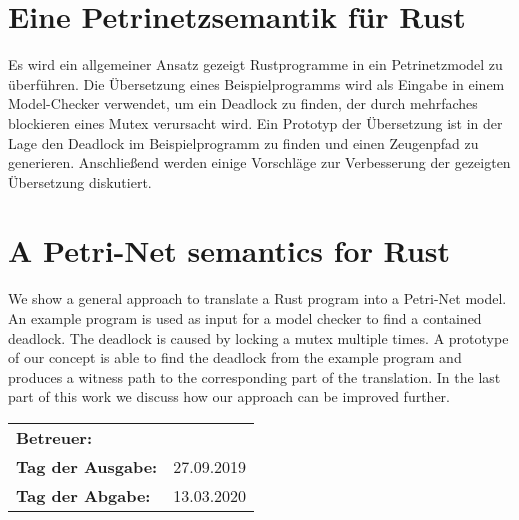 \section*{Eine Petrinetzsemantik für Rust}
Es wird ein allgemeiner Ansatz gezeigt Rustprogramme in ein Petrinetzmodel zu überführen.
Die Übersetzung eines Beispielprogramms wird als Eingabe in einem Model-Checker verwendet, um ein Deadlock zu finden, der durch mehrfaches blockieren eines Mutex verursacht wird.
Ein Prototyp der Übersetzung ist in der Lage den Deadlock im Beispielprogramm zu finden und einen Zeugenpfad zu generieren.
Anschließend werden einige Vorschläge zur Verbesserung der gezeigten Übersetzung diskutiert.

\section*{A Petri-Net semantics for Rust}
We show a general approach to translate a Rust program into a Petri-Net model.
An example program is used as input for a model checker to find a contained deadlock.
The deadlock is caused by locking a mutex multiple times.
A prototype of our concept is able to find the deadlock from the example program and produces a witness path to the corresponding part of the translation.
In the last part of this work we discuss how our approach can be improved further.

\vfill

\begin{tabular}{ll}
	\bfseries Betreuer: & \parbox[t]{10cm}{\betreuer }\vspace{5mm} \\
	\bfseries Tag der Ausgabe: & 27.09.2019 \\
	\bfseries Tag der Abgabe: & 13.03.2020 \\
\end{tabular}
